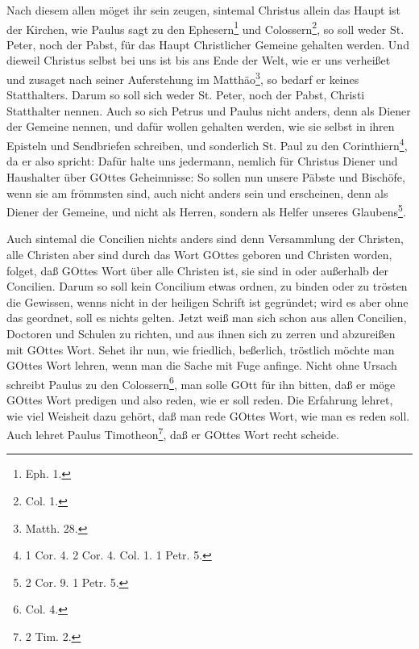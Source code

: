 Nach diesem allen möget ihr sein zeugen, sintemal Christus allein das Haupt ist der Kirchen, wie Paulus sagt zu den Ephesern\footnote{Eph. 1.} und Colossern\footnote{Col. 1.}, so soll weder St. Peter, noch der Pabst, für das Haupt Christlicher Gemeine gehalten werden. Und dieweil Christus selbst bei uns ist bis ans Ende der Welt, wie er uns verheißet und zusaget nach seiner Auferstehung im Matthäo\footnote{Matth. 28.}, so bedarf er keines Statthalters. Darum
so soll sich weder St. Peter, noch der Pabst, Christi Statthalter nennen. Auch so sich Petrus und Paulus nicht anders, denn als Diener der Gemeine nennen, und dafür wollen gehalten werden, wie sie selbst in ihren Episteln und Sendbriefen schreiben, und sonderlich St. Paul zu den Corinthiern\footnote{1 Cor. 4. 2 Cor. 4. Col. 1. 1 Petr. 5.}, da er also spricht: Dafür halte uns jedermann, nemlich für Christus Diener und Haushalter über GOttes Geheimnisse: So sollen nun unsere Päbste und Bischöfe, wenn sie am frömmsten sind, auch nicht anders sein und erscheinen, denn als Diener der Gemeine, und nicht als Herren, sondern als Helfer unseres Glaubens\footnote{2 Cor. 9. 1 Petr. 5.}.

Auch sintemal die Concilien nichts anders sind denn Versammlung der Christen, alle Christen aber sind durch das Wort GOttes geboren und Christen worden, folget, daß GOttes Wort über alle Christen ist, sie sind in oder außerhalb der Concilien. Darum so soll kein Concilium etwas ordnen, zu binden oder zu trösten die Gewissen, wenns nicht in der heiligen Schrift ist gegründet; wird es aber ohne das geordnet, soll es nichts gelten. Jetzt weiß man sich schon aus allen Concilien, Doctoren und Schulen zu richten, und aus ihnen sich zu zerren und abzureißen mit GOttes Wort. Sehet ihr nun, wie friedlich, beßerlich, tröstlich möchte man GOttes Wort lehren, wenn man die Sache mit Fuge anfinge. Nicht ohne Ursach schreibt Paulus zu den Colossern\footnote{Col. 4.}, man solle GOtt für ihn bitten, daß er möge GOttes Wort predigen und also reden, wie er soll reden. Die Erfahrung lehret, wie viel Weisheit dazu gehört, daß man rede GOttes Wort, wie man es reden soll. Auch lehret Paulus Timotheon\footnote{2 Tim. 2.}, daß er GOttes Wort recht scheide.

